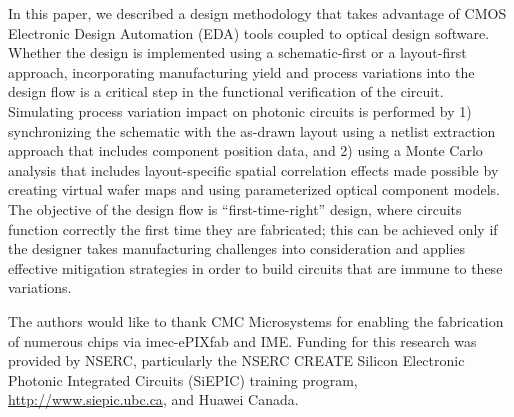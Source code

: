 \documentclass[journal]{spie}
\begin{document}
In this paper, we described a design methodology that takes advantage of CMOS Electronic Design Automation (EDA) tools coupled to optical design software.  Whether the design is implemented using a schematic-first or a layout-first approach, incorporating manufacturing yield and process variations into the design flow is a critical step in the functional verification of the circuit.  Simulating process variation impact on photonic circuits is performed by 1) synchronizing the schematic with the as-drawn layout using a netlist extraction approach that includes component position data, and 2) using a Monte Carlo analysis that includes layout-specific spatial correlation effects made possible by creating virtual wafer maps and using parameterized optical component models.
The  objective of the design flow is ``first-time-right'' design, where circuits function correctly the first time they are fabricated; this can be achieved only if the designer takes manufacturing challenges into consideration and applies effective mitigation strategies in order to build circuits that are immune to these variations.

%
%




\acknowledgments

The authors would like to thank CMC Microsystems for enabling the fabrication of numerous chips via imec-ePIXfab and IME.  Funding for this research was provided by NSERC, particularly the NSERC CREATE Silicon Electronic Photonic Integrated Circuits (SiEPIC) training program, \url{http://www.siepic.ubc.ca}, and Huawei Canada.



\end{document}
